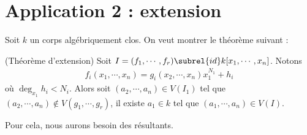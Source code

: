     \section{Application 2 : extension}
        Soit $k$ un corps algébriquement clos. On veut montrer le théorème suivant :
        \begin{theo} (Théorème d'extension)
            Soit $I = (f_1, \cdots, f_r) \subrel{id} k[x_1, \cdots, x_n]$. Notons
            \begin{align*}
                f_i(x_1, \cdots, x_n) = g_i(x_2, \cdots, x_n)x_1^{N_1} + h_i
            \end{align*}
            où $\deg_{x_1} h_i < N_i$. Alors soit $(a_2, \cdots, a_n) \in V(I_1)$ tel que $(a_2, \cdots, a_n) \notin V(g_1, \cdots, g_r)$, il existe $a_1 \in k$ tel que $(a_1, \cdots, a_n) \in V(I)$.
        \end{theo}
        Pour cela, nous aurons besoin des résultants.

